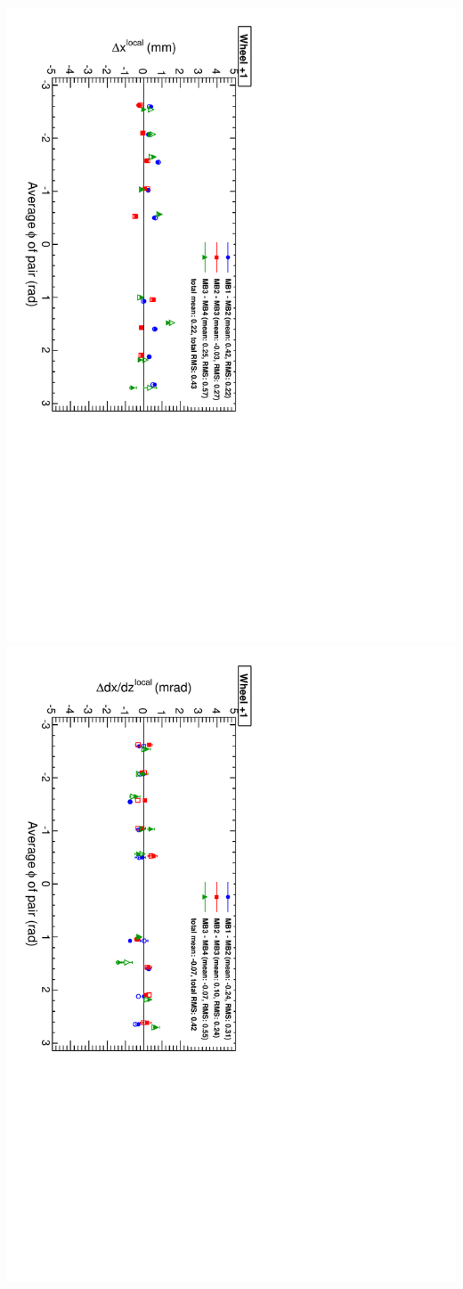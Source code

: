 \documentclass[compress]{beamer}
\begin{document}
\begin{frame}
\vspace{-0.1 cm}
\includegraphics[height=0.5\linewidth, angle=90]{NOV4_segdiff_x_whp1.pdf}
\includegraphics[height=0.5\linewidth, angle=90]{NOV4_segdiff_dxdz_whp1.pdf}
\end{frame}
\end{document}
